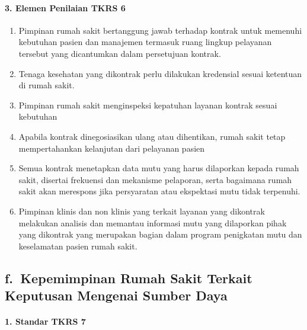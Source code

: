 \documentclass[
]{book}
\providecommand{\tightlist}{%
  \setlength{\itemsep}{0pt}\setlength{\parskip}{0pt}}
\begin{document}
\hypertarget{elemen-penilaian-tkrs-6}{%
\paragraph*{3. Elemen Penilaian TKRS 6}\label{elemen-penilaian-tkrs-6}}

\begin{enumerate}
\def\labelenumi{\alph{enumi}.}
\tightlist
\item
  Pimpinan rumah sakit bertanggung jawab terhadap kontrak untuk memenuhi kebutuhan pasien dan manajemen termasuk ruang lingkup pelayanan tersebut yang dicantumkan dalam persetujuan kontrak.
\item
  Tenaga kesehatan yang dikontrak perlu dilakukan kredensial sesuai ketentuan di rumah sakit.
\item
  Pimpinan rumah sakit menginspeksi kepatuhan layanan kontrak sesuai kebutuhan
\item
  Apabila kontrak dinegosiasikan ulang atau dihentikan, rumah sakit tetap mempertahankan kelanjutan dari pelayanan pasien
\item
  Semua kontrak menetapkan data mutu yang harus dilaporkan kepada rumah sakit, disertai frekuensi dan mekanisme pelaporan, serta bagaimana rumah sakit akan merespons jika persyaratan atau ekspektasi mutu tidak terpenuhi.
\item
  Pimpinan klinis dan non klinis yang terkait layanan yang dikontrak melakukan analisis dan memantau informasi mutu yang dilaporkan pihak yang dikontrak yang merupakan bagian dalam program penigkatan mutu dan keselamatan pasien rumah sakit.
\end{enumerate}

\hypertarget{f.-kepemimpinan-rumah-sakit-terkait-keputusan-mengenai-sumber-daya}{%
\subsection*{f.~Kepemimpinan Rumah Sakit Terkait Keputusan Mengenai Sumber Daya}\label{f.-kepemimpinan-rumah-sakit-terkait-keputusan-mengenai-sumber-daya}}

\hypertarget{standar-tkrs-7}{%
\paragraph*{1. Standar TKRS 7}\label{standar-tkrs-7}}
\end{document}
